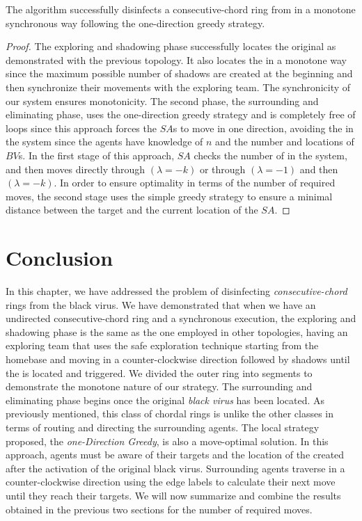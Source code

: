 \begin{theorem}\label{one-d-noloop}
The  algorithm  successfully disinfects a consecutive-chord ring from \bvs in a monotone synchronous way following  the one-direction greedy strategy. 
\end{theorem}
\begin{proof}
The exploring and shadowing phase successfully locates the original \bv as demonstrated with the previous topology. It also locates the \bv in a monotone way since the maximum possible number of shadows are created at the beginning and then synchronize their movements with the exploring team. The synchronicity of our system ensures monotonicity. 
The second phase, the surrounding and eliminating phase, uses the one-direction greedy strategy and is completely free of loops since this approach forces the $SA$s to move in one direction, avoiding the \bvs in the system since the agents have knowledge of $n$ and the number and locations of $BV$s. In the first stage of this approach, $SA$ checks the number of \bvs in the system, and then moves directly through $(\lambda=-k)$ or through $(\lambda=-1)$ and then $(\lambda=-k)$. In order to ensure optimality in terms of the number of required moves, the second stage uses the simple greedy strategy to ensure a minimal distance between the target and the current location of the $SA$.

\end{proof}




\section{Conclusion }  




In this chapter, we have addressed the problem of disinfecting {\it consecutive-chord} rings from the black virus. We have demonstrated that when we have an undirected consecutive-chord ring and a synchronous execution, the exploring and shadowing phase is the same as the one employed in other topologies, having an exploring team that uses the safe exploration technique starting from the homebase and moving in a counter-clockwise direction followed by shadows until the \bv is located and triggered. We divided the outer ring into segments to demonstrate the monotone nature of our strategy. The surrounding and eliminating phase begins once the original {\it black virus} has been located. As previously mentioned, this class of chordal rings is unlike the other classes in terms of routing and directing the surrounding agents. The local strategy proposed, the {\it one-Direction Greedy}, is also a move-optimal solution. In this approach, agents must be aware of their targets and the location of the \bvs created after the activation of the original black virus. Surrounding agents traverse in a counter-clockwise direction using the edge labels to calculate their next move until they reach their targets.  We will now summarize and combine the results obtained in the previous two sections for the number of required moves.








